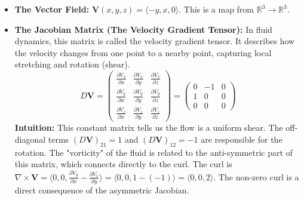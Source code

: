 \documentclass[12pt, letterpaper]{article}
\theoremstyle{definition}
\begin{document}
	\begin{itemize}
		\item \textbf{The Vector Field:} $\mathbf{V}(x, y, z) = \langle -y, x, 0 \rangle$. This is a map from $\mathbb{R}^3 \to \mathbb{R}^3$.
		
		\item \textbf{The Jacobian Matrix (The Velocity Gradient Tensor):} In fluid dynamics, this matrix is called the velocity gradient tensor. It describes how the velocity changes from one point to a nearby point, capturing local stretching and rotation (shear).
		\begin{equation*}
			D\mathbf{V} = \begin{pmatrix}
				\frac{\partial V_x}{\partial x} & \frac{\partial V_x}{\partial y} & \frac{\partial V_x}{\partial z} \\
				\frac{\partial V_y}{\partial x} & \frac{\partial V_y}{\partial y} & \frac{\partial V_y}{\partial z} \\
				\frac{\partial V_z}{\partial x} & \frac{\partial V_z}{\partial y} & \frac{\partial V_z}{\partial z}
			\end{pmatrix}
			= \begin{pmatrix}
				0 & -1 & 0 \\
				1 & 0 & 0 \\
				0 & 0 & 0
			\end{pmatrix}
		\end{equation*}
		\textbf{Intuition:} This constant matrix tells us the flow is a uniform shear. The off-diagonal terms $(D\mathbf{V})_{21} = 1$ and $(D\mathbf{V})_{12} = -1$ are responsible for the rotation. The "vorticity" of the fluid is related to the anti-symmetric part of this matrix, which connects directly to the curl. The curl is $\nabla \times \mathbf{V} = \langle 0, 0, \frac{\partial V_y}{\partial x} - \frac{\partial V_x}{\partial y} \rangle = \langle 0, 0, 1 - (-1) \rangle = \langle 0, 0, 2 \rangle$. The non-zero curl is a direct consequence of the asymmetric Jacobian.
		

\end{itemize}
\end{document}
